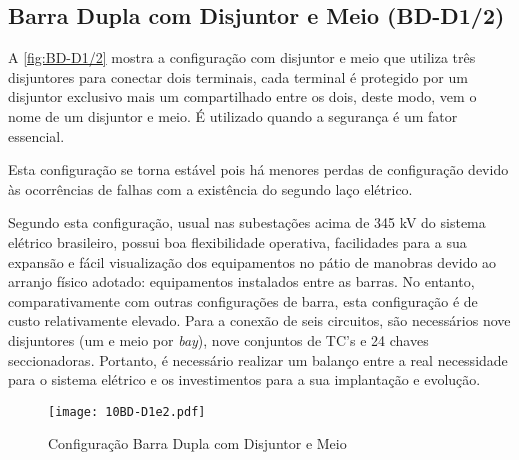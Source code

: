 		\subsection{Barra Dupla com Disjuntor e Meio (BD-D1/2)}
			A \autoref{fig:BD-D1/2} mostra a configuração com disjuntor e meio que utiliza três disjuntores para conectar dois terminais, cada terminal é protegido por um disjuntor exclusivo mais um compartilhado entre os dois, deste modo, vem o nome de um disjuntor e meio. É utilizado quando a segurança é um fator essencial.\par
			Esta configuração se torna estável pois há menores perdas de configuração devido às ocorrências de falhas com a existência do segundo laço elétrico.\par
			Segundo  esta configuração, usual nas subestações acima de 345 kV do sistema elétrico brasileiro, possui boa flexibilidade operativa, facilidades para a sua expansão e fácil visualização dos equipamentos no pátio de manobras devido ao arranjo físico adotado: equipamentos instalados entre as barras. No entanto, comparativamente com outras configurações de barra, esta configuração é de custo relativamente elevado. Para a conexão de seis circuitos, são necessários nove disjuntores (um e meio por \textit{bay}), nove conjuntos de TC’s e 24 chaves seccionadoras. Portanto, é necessário realizar um balanço entre a real necessidade para o sistema elétrico e os investimentos para a sua implantação e evolução.\par
			\begin{figure}[!htb]
				\caption{Configuração Barra Dupla com Disjuntor e Meio}
				\centering
				\texttt{[image: 10BD-D1e2.pdf]}
				\label{fig:BD-D1/2}
				\end{figure}
